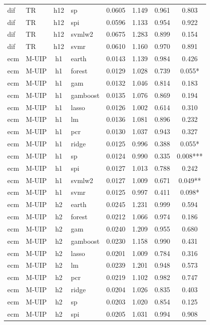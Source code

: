 \begin{ThreePartTable}
\begin{longtable}[t]{llclcccc}
dif & TR & h12 & sp & 0.0605 & 1.149 & 0.961 & 0.803\\
dif & TR & h12 & spi & 0.0596 & 1.133 & 0.954 & 0.922\\
dif & TR & h12 & svmlw2 & 0.0675 & 1.283 & 0.899 & 0.154\\
dif & TR & h12 & svmr & 0.0610 & 1.160 & 0.970 & 0.891\\
\addlinespace
ecm & M-UIP & h1 & earth & 0.0143 & 1.139 & 0.984 & 0.426\\
ecm & M-UIP & h1 & forest & 0.0129 & 1.028 & 0.739 & 0.055*\\
ecm & M-UIP & h1 & gam & 0.0132 & 1.046 & 0.814 & 0.183\\
ecm & M-UIP & h1 & gamboost & 0.0135 & 1.076 & 0.869 & 0.194\\
ecm & M-UIP & h1 & lasso & 0.0126 & 1.002 & 0.614 & 0.310\\
ecm & M-UIP & h1 & lm & 0.0136 & 1.081 & 0.896 & 0.232\\
ecm & M-UIP & h1 & pcr & 0.0130 & 1.037 & 0.943 & 0.327\\
ecm & M-UIP & h1 & ridge & 0.0125 & 0.996 & 0.388 & 0.055*\\
ecm & M-UIP & h1 & sp & 0.0124 & 0.990 & 0.335 & 0.008***\\
ecm & M-UIP & h1 & spi & 0.0127 & 1.013 & 0.788 & 0.242\\
ecm & M-UIP & h1 & svmlw2 & 0.0127 & 1.009 & 0.671 & 0.049**\\
ecm & M-UIP & h1 & svmr & 0.0125 & 0.997 & 0.411 & 0.098*\\
\addlinespace
ecm & M-UIP & h2 & earth & 0.0245 & 1.231 & 0.999 & 0.594\\
ecm & M-UIP & h2 & forest & 0.0212 & 1.066 & 0.974 & 0.186\\
ecm & M-UIP & h2 & gam & 0.0240 & 1.209 & 0.955 & 0.680\\
ecm & M-UIP & h2 & gamboost & 0.0230 & 1.158 & 0.990 & 0.431\\
ecm & M-UIP & h2 & lasso & 0.0201 & 1.009 & 0.784 & 0.316\\
ecm & M-UIP & h2 & lm & 0.0239 & 1.201 & 0.948 & 0.573\\
ecm & M-UIP & h2 & pcr & 0.0219 & 1.102 & 0.982 & 0.747\\
ecm & M-UIP & h2 & ridge & 0.0204 & 1.026 & 0.835 & 0.403\\
ecm & M-UIP & h2 & sp & 0.0203 & 1.020 & 0.854 & 0.125\\
ecm & M-UIP & h2 & spi & 0.0205 & 1.031 & 0.994 & 0.908\\

\end{longtable}
\end{ThreePartTable}
